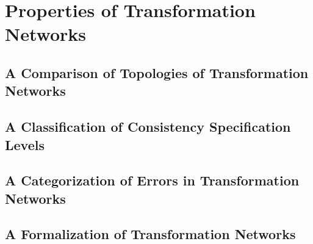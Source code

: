 \part{Properties of Transformation Networks }
\chapter{A Comparison of Topologies of Transformation Networks}
\chapter{A Classification of Consistency Specification Levels}
\chapter{A Categorization of Errors in Transformation Networks}
\chapter{A Formalization of Transformation Networks}

